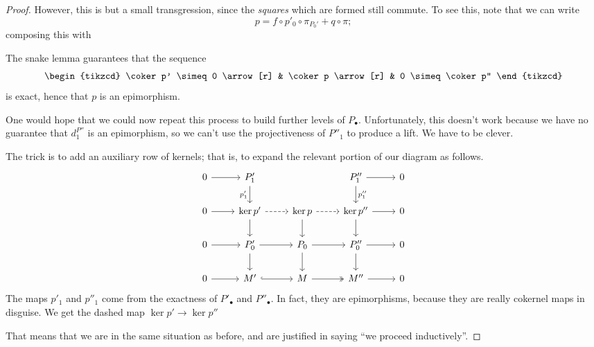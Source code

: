 \documentclass[main.tex]{subfiles}
\begin{document}
\begin{proof}
  However, this is but a small transgression, since the \emph{squares} which are formed still commute. To see this, note that we can write
  \begin{equation*}
    p = f \circ p'_{0} \circ \pi_{P_{0}'} + q \circ \pi;
  \end{equation*}
  composing this with

  The snake lemma guarantees that the sequence
  \begin{equation*}
    \begin{tikzcd}
      \coker p' \simeq 0
      \arrow[r]
      & \coker p
      \arrow[r]
      & 0 \simeq \coker p''
    \end{tikzcd}
  \end{equation*}
  is exact, hence that $p$ is an epimorphism.

  One would hope that we could now repeat this process to build further levels of $P_{\bullet}$. Unfortunately, this doesn't work because we have no guarantee that $d^{P''}_{1}$ is an epimorphism, so we can't use the projectiveness of $P''_{1}$ to produce a lift. We have to be clever.

  The trick is to add an auxiliary row of kernels; that is, to expand the relevant portion of our diagram as follows.
  \begin{equation*}
    \begin{tikzcd}
      0
      \arrow[r]
      & P'_{1}
      \arrow[d, swap, "p_{1}'"]
      && P''_{1}
      \arrow[r]
      \arrow[d, "p_{1}''"]
      & 0
      \\
      0
      \arrow[r]
      & \ker p'
      \arrow[r, dashed]
      \arrow[d]
      & \ker p
      \arrow[r, dashed]
      \arrow[d]
      & \ker p''
      \arrow[r]
      \arrow[d]
      & 0
      \\
      0
      \arrow[r]
      & P'_{0}
      \arrow[r]
      \arrow[d]
      & P_{0}
      \arrow[r]
      \arrow[d]
      & P''_{0}
      \arrow[r]
      \arrow[d]
      & 0
      \\
      0
      \arrow[r]
      & M'
      \arrow[r, hook]
      & M
      \arrow[r, two heads]
      & M''
      \arrow[r]
      & 0
    \end{tikzcd}
  \end{equation*}
  The maps $p'_{1}$ and $p''_{1}$ come from the exactness of $P'_{\bullet}$ and $P''_{\bullet}$. In fact, they are epimorphisms, because they are really cokernel maps in disguise. We get the dashed map $\ker p' \to \ker p''$

  That means that we are in the same situation as before, and are justified in saying ``we proceed inductively''.
\end{proof}
\end{document}
